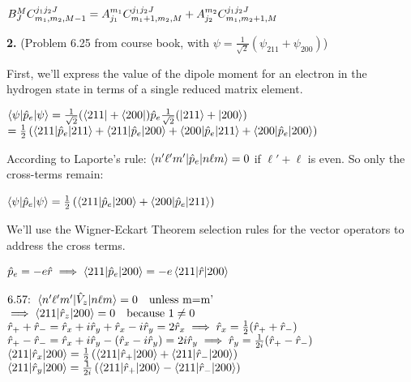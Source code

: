 \documentclass[14pt]{extarticle}
\makeatletter
\newenvironment{lefteqs}{%
    \begin{flushleft}%
    \renewcommand{\arraystretch}{1.3}%
    $\begin{array}{@{}l@{}}%
}{%
    \end{array}$%
    \end{flushleft}%
}
\makeatother
\begin{document}
\begin{lefteqs}
    B^M_J C^{j_1 j_2 J}_{m_1, m_2, M-1} = A^{m_1}_{j_1} C^{j_1 j_2 J}_{m_1+1, m_2, M} + A^{m_2}_{j_2} C^{j_1 j_2 J}_{m_1, m_2+1, M}
\end{lefteqs}


\newpage

\textbf{\large 2.}
(Problem 6.25 from course book, with $\psi=\frac{1}{\sqrt{2}} (\psi_{211} + \psi_{200})$)

First, we'll express the value of the dipole moment for an electron in the hydrogen state in terms of a single reduced matrix element.

\begin{lefteqs}
    \braket{\psi | \hat{p}_e | \psi} = \frac{1}{\sqrt{2}} (\bra{211} + \bra{200}) \hat{p}_e \frac{1}{\sqrt{2}} (\ket{211} + \ket{200}) \\
    = \frac{1}{2} \left( \braket{211 | \hat{p}_e | 211} + \braket{211 | \hat{p}_e | 200} + \braket{200 | \hat{p}_e | 211} + \braket{200 | \hat{p}_e | 200} \right) \\
\end{lefteqs}

According to Laporte's rule: $\braket{n' \ell' m' | \hat{p}_e | n \ell m} = 0$ if $\ell' + \ell$ is even.
So only the cross-terms remain:
\begin{lefteqs}
    \braket{\psi | \hat{p}_e | \psi} = \frac{1}{2} \left( \braket{211 | \hat{p}_e | 200} + \braket{200 | \hat{p}_e | 211} \right)
\end{lefteqs}

We'll use the Wigner-Eckart Theorem selection rules for the vector operators to address the cross terms.

\begin{lefteqs}
    \hat{p}_e = -e \hat{r} \implies \braket{211 | \hat{p}_e | 200} = -e \braket{211 | \hat{r} | 200} \\ \\
    \text{6.57: } \braket{n' \ell' m' | \hat{V}_z | n \ell m} = 0 \quad \text{unless m=m'} \\
    \implies \braket{211 | \hat{r}_z | 200} = 0 \quad \text{because } 1 \neq 0 \\
    \hat{r}_+ + \hat{r}_- = \hat{r}_x + i \hat{r}_y + \hat{r}_x - i \hat{r}_y = 2 \hat{r}_x \implies \hat{r}_x = \frac{1}{2} (\hat{r}_+ + \hat{r}_-) \\
    \hat{r}_+ - \hat{r}_- = \hat{r}_x + i \hat{r}_y - (\hat{r}_x - i \hat{r}_y) = 2 i \hat{r}_y \implies \hat{r}_y = \frac{1}{2i} (\hat{r}_+ - \hat{r}_-) \\
    \braket{211 | \hat{r}_x | 200} = \frac{1}{2} \left( \braket{211 | \hat{r}_+ | 200} + \braket{211 | \hat{r}_- | 200} \right) \\
    \braket{211 | \hat{r}_y | 200} = \frac{1}{2i} \left( \braket{211 | \hat{r}_+ | 200} - \braket{211 | \hat{r}_- | 200} \right) \\
\end{lefteqs}
\end{document}
